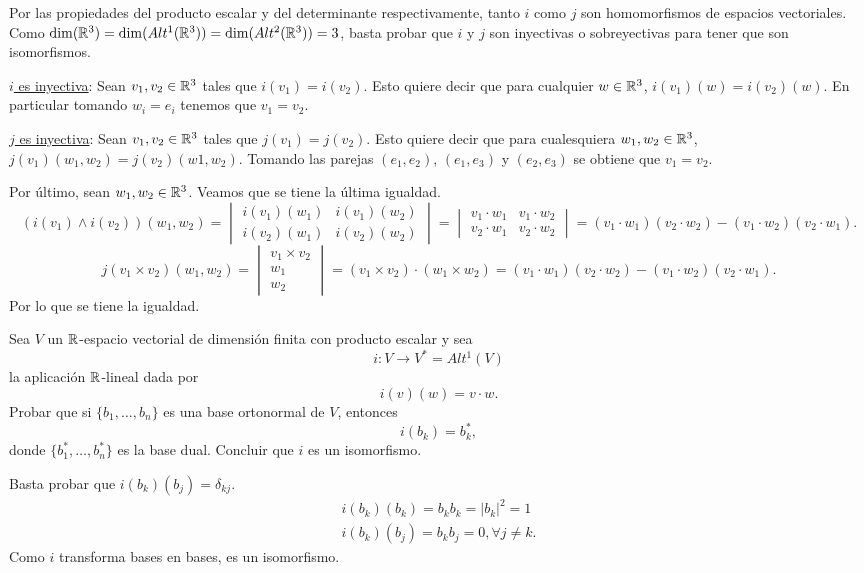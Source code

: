\documentclass[twoside]{article}
\begin{document}
\begin{solucion}
Por las propiedades del producto escalar y del determinante respectivamente, tanto $i$ como $j$ son homomorfismos de espacios vectoriales. Como $\dim(\mathbb{R}^3)=\dim(Alt^1(\mathbb{R}^3))=\dim(Alt^2(\mathbb{R}^3))=3$, basta probar que $i$ y $j$ son inyectivas o sobreyectivas para tener que son isomorfismos.

\underline{$i$ es inyectiva}:
Sean $v_1,v_2\in\mathbb{R}^3$ tales que $i(v_1)=i(v_2)$. Esto quiere decir que para cualquier $w\in\mathbb{R}^3$, $i(v_1)(w)=i(v_2)(w)$. En particular tomando $w_i=e_i$ tenemos que $v_1=v_2$. 


\underline{$j$ es inyectiva}:
Sean $v_1,v_2\in\mathbb{R}^3$ tales que $j(v_1)=j(v_2)$. Esto quiere decir que para cualesquiera $w_1,w_2\in\mathbb{R}^3$, $j(v_1)(w_1,w_2)=j(v_2)(w1,w_2)$. Tomando las parejas $(e_1,e_2)$, $(e_1,e_3)$ y $(e_2,e_3)$ se obtiene que $v_1=v_2$. 

Por último, sean $w_1,w_2\in\mathbb{R}^3$. Veamos que se tiene la última igualdad.
$$(i(v_1)\land i(v_2))(w_1,w_2)=\begin{vmatrix}
i(v_1)(w_1) & i(v_1)(w_2)\\
i(v_2)(w_1) & i(v_2)(w_2)
\end{vmatrix}=\begin{vmatrix}
v_1\cdot w_1 & v_1\cdot w_2\\
v_2\cdot w_1 & v_2\cdot w_2
\end{vmatrix}=(v_1\cdot w_1)(v_2\cdot w_2)-(v_1\cdot w_2)(v_2\cdot w_1).$$
$$j(v_1\times v_2)(w_1,w_2)=\begin{vmatrix}
v_1\times v_2\\
w_1\\
w_2
\end{vmatrix}=(v_1\times v_2)\cdot (w_1\times w_2)=(v_1\cdot w_1)(v_2\cdot w_2)-(v_1\cdot w_2)(v_2\cdot w_1).$$
Por lo que se tiene la igualdad. 
\end{solucion}

\newpage

\begin{ejercicio}{4}
Sea $V$ un $\mathbb{R}$-espacio vectorial de dimensión finita con producto escalar y sea 
$$i:V\to V^*=Alt^1(V)$$
la aplicación $\mathbb{R}$-lineal dada por 
$$i(v)(w)=v\cdot w.$$
Probar que si $\{b_1,\dots, b_n\}$ es una base ortonormal de $V$, entonces
$$i(b_k)=b_k^*,$$
donde $\{b_1^*,\dots, b_n^*\}$ es la base dual. Concluir que $i$ es un isomorfismo.
\end{ejercicio}
\begin{solucion}
Basta probar que $i(b_k)(b_j)=\delta_{kj}$. 
\begin{gather*}
i(b_k)(b_k)=b_kb_k=|b_k|^2=1\\
i(b_k)(b_j)=b_kb_j=0, \forall j\neq k.
\end{gather*}
Como $i$ transforma bases en bases, es un isomorfismo.
\end{solucion}
\end{document}
